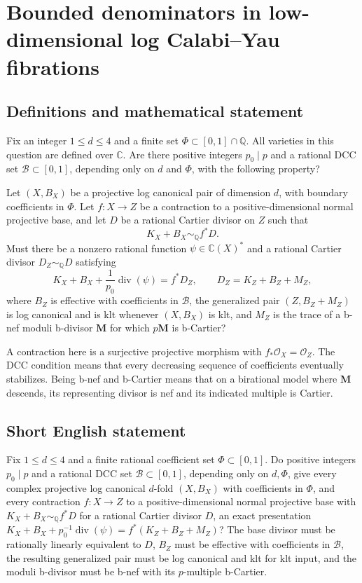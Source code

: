 \documentclass[11pt]{article}
\begin{document}
\section*{Bounded denominators in low-dimensional log Calabi–Yau fibrations}\label{30007016}
\subsection{Definitions and mathematical statement}
Fix an integer \(1\le d\le4\) and a finite set \(\Phi\subset[0,1]\cap\mathbb Q\). All varieties in this question are defined over \(\mathbb C\). Are there positive integers \(p_0\mid p\) and a rational DCC set \(\mathcal B\subset[0,1]\), depending only on \(d\) and \(\Phi\), with the following property?

Let \((X,B_X)\) be a projective log canonical pair of dimension \(d\), with boundary coefficients in \(\Phi\). Let \(f:X\to Z\) be a contraction to a positive-dimensional normal projective base, and let \(D\) be a rational Cartier divisor on \(Z\) such that
\[
 K_X+B_X\sim_{\mathbb Q}f^*D.
\]
Must there be a nonzero rational function \(\psi\in\mathbb C(X)^*\) and a rational Cartier divisor \(D_Z\sim_{\mathbb Q}D\) satisfying
\[
 K_X+B_X+\frac1{p_0}\operatorname{div}(\psi)=f^*D_Z,
 \qquad D_Z=K_Z+B_Z+M_Z,
\]
where \(B_Z\) is effective with coefficients in \(\mathcal B\), the generalized pair \((Z,B_Z+M_Z)\) is log canonical and is klt whenever \((X,B_X)\) is klt, and \(M_Z\) is the trace of a b-nef moduli b-divisor \(\mathbf M\) for which \(p\mathbf M\) is b-Cartier?

A contraction here is a surjective projective morphism with \(f_*\mathcal O_X=\mathcal O_Z\). The DCC condition means that every decreasing sequence of coefficients eventually stabilizes. Being b-nef and b-Cartier means that on a birational model where \(\mathbf M\) descends, its representing divisor is nef and its indicated multiple is Cartier.
\subsection{Short English statement}
Fix \(1\le d\le4\) and a finite rational coefficient set \(\Phi\subset[0,1]\). Do positive integers \(p_0\mid p\) and a rational DCC set \(\mathcal B\subset[0,1]\), depending only on \(d,\Phi\), give every complex projective log canonical \(d\)-fold \((X,B_X)\) with coefficients in \(\Phi\), and every contraction \(f:X\to Z\) to a positive-dimensional normal projective base with \(K_X+B_X\sim_{\mathbb Q}f^*D\) for a rational Cartier divisor \(D\), an exact presentation \(K_X+B_X+p_0^{-1}\operatorname{div}(\psi)=f^*(K_Z+B_Z+M_Z)\)? The base divisor must be rationally linearly equivalent to \(D\), \(B_Z\) must be effective with coefficients in \(\mathcal B\), the resulting generalized pair must be log canonical and klt for klt input, and the moduli b-divisor must be b-nef with its \(p\)-multiple b-Cartier.
\end{document}
